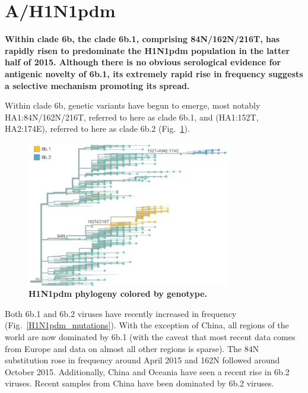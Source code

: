\documentclass[11pt,oneside,letterpaper]{article}
\begin{document}
\clearpage
\pagebreak

\section*{A/H1N1pdm}

\textbf{Within clade 6b, the clade 6b.1, comprising 84N/162N/216T, has rapidly risen to predominate the H1N1pdm population in the latter half of 2015. Although there is no obvious serological evidence for antigenic novelty of 6b.1, its extremely rapid rise in frequency suggests a selective mechanism promoting its spread.}

Within clade 6b, genetic variants have begun to emerge, most notably HA1:84N/162N/216T, referred to here as clade 6b.1, and (HA1:152T, HA2:174E), referred to here as clade 6b.2 (Fig.\ \ref{H1N1pdm_tree}).

\begin{figure}[h!]
	\centering		
	\includegraphics[width=0.8\textwidth]{../figures/feb-2016/H1N1pdm_tree.png}
	\caption{\textbf{H1N1pdm phylogeny colored by genotype.} 
	}
	\label{H1N1pdm_tree}
\end{figure}

\pagebreak

Both 6b.1 and 6b.2 viruses have recently increased in frequency (Fig.\ \ref{H1N1pdm_mutations}). With the exception of China, all regions of the world are now dominated by 6b.1 (with the caveat that most recent data comes from Europe and data on almost all other regions is sparse). The 84N substitution rose in frequency around April 2015 and 162N followed around October 2015. Additionally, China and Oceania have seen a recent rise in 6b.2 viruses. Recent samples from China have been dominated by 6b.2 viruses.
\end{document}
